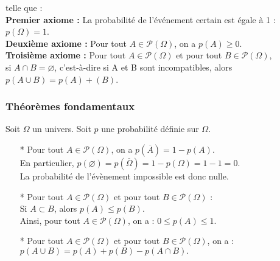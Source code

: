 telle que : \\

\textbf{Premier axiome :} La probabilité de l'événement certain est égale à 1 : $p\left(\Omega\right) = 1$. \\

\textbf{Deuxième axiome : } Pour tout $A \in \mathcal{P}\left (\Omega\right )$, on a $ p\left(A\right) \geq 0$. \\

\textbf{Troisième axiome :} Pour tout $A \in \mathcal{P}\left (\Omega\right )$ et pour tout $B \in \mathcal{P}\left (\Omega\right )$,  \\ si $A \cap B = \varnothing$, c'est-à-dire si A et B sont incompatibles, alors $p\left(A\cup B\right) = p \left(A\right) + \left(B \right)$.

\subsubsection{Théorèmes fondamentaux}

Soit $\Omega$ un univers. Soit $p$ une probabilité définie sur $\Omega$. \\

\begin{itemize}
\item[*] Pour tout $A \in \mathcal{P}\left (\Omega\right )$, on a $p\left(\overline{A}\right) = 1 - p\left(A\right)$. \\ En particulier, $p\left(\varnothing\right) = p\left(\overline{\Omega}\right) = 1 - p\left(\Omega\right) = 1 - 1 = 0$. \\ La probabilité de l'évènement impossible est donc nulle. \\

\item[*] Pour tout $A \in \mathcal{P}\left (\Omega\right )$ et pour tout $B\in \mathcal{P}\left (\Omega\right )$ : \\ Si $A \subset B$, alors $p\left(A\right) \leq p\left(B\right)$. \\ Ainsi, pour tout $A \in \mathcal{P}\left (\Omega\right )$, on a : $0 \leq p\left(A\right) \leq 1$. \\

\item[*] Pour tout $A\in \mathcal{P}\left (\Omega\right )$ et pour tout $B \in \mathcal{P}\left (\Omega\right )$, on a : $p\left(A\cup B\right) = p\left(A\right) + p\left(B\right) - p\left(A\cap B\right).$ \\
\end{itemize}

